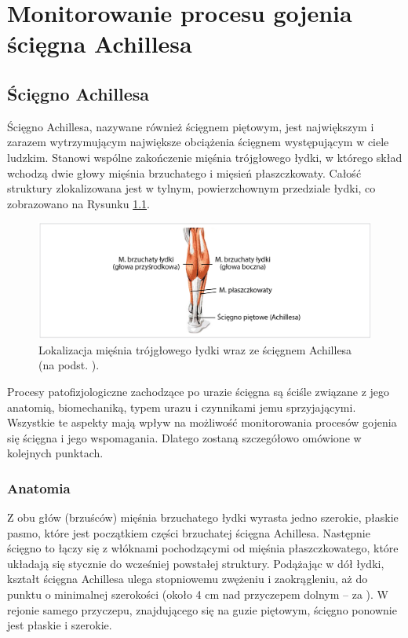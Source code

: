 \chapter{Monitorowanie procesu gojenia ścięgna Achillesa}
\section{Ścięgno Achillesa}
Ścięgno Achillesa, nazywane również ścięgnem piętowym, jest największym i zarazem wytrzymującym największe obciążenia ścięgnem występującym w ciele ludzkim. Stanowi wspólne zakończenie mięśnia trójgłowego łydki, w którego skład wchodzą dwie głowy mięśnia brzuchatego i mięsień płaszczkowaty. Całość struktury zlokalizowana jest w tylnym, powierzchownym przedziale łydki, co zobrazowano \linebreak na Rysunku \ref{muscle_structure}.  
\begin{figure}[h!]
\includegraphics[width=1\textwidth]{figures/muscleStructure.png}
\caption{Lokalizacja mięśnia trójgłowego łydki wraz ze ścięgnem Achillesa (na podst. \cite{Doral2010}).}
\label{muscle_structure}
\end{figure}
\newpage
Procesy patofizjologiczne zachodzące po urazie ścięgna są ściśle związane z jego anatomią, biomechaniką, typem urazu i czynnikami jemu sprzyjającymi. Wszystkie te aspekty mają wpływ na możliwość monitorowania procesów gojenia się ścięgna \linebreak i jego wspomagania. Dlatego zostaną szczegółowo omówione w kolejnych punktach. 

\subsection{Anatomia}
\label{anatomia}

Z obu głów (brzuśców) mięśnia brzuchatego łydki wyrasta jedno szerokie, płaskie pasmo, które jest początkiem części brzuchatej ścięgna Achillesa. Następnie ścięgno to łączy się z włóknami pochodzącymi od mięśnia płaszczkowatego, które układają się stycznie do wcześniej powstałej struktury. Podążając w dół łydki, kształt ścięgna Achillesa ulega stopniowemu zwężeniu i zaokrągleniu, aż do punktu o minimalnej szerokości (około 4 cm nad przyczepem dolnym -- za \cite{Doral2010}). W rejonie samego przyczepu, znajdującego się na guzie piętowym, ścięgno ponownie jest płaskie i szerokie.

